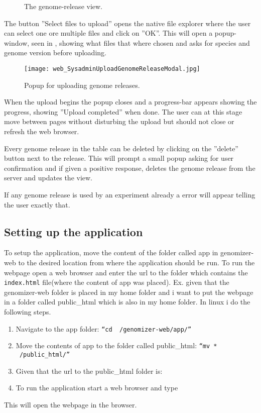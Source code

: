 \begin{figure}[h]
 \caption{The genome-release view.}
 \label{adm_web_genomereleaseView}
\end{figure}

The button ''Select files to upload'' opens the native file explorer where the user can select one ore multiple files and click on ''OK''. This will open a popup-window, seen in , showing what files that where chosen and asks for species and genome version before uploading. 

\begin{figure}[h]
 \centering
 \texttt{[image: web\_SysadminUploadGenomeReleaseModal.jpg]}
 \caption{Popup for uploading genome releases.}
 \label{adm_web_uploadconfirm}
\end{figure}

When the upload begins the popup closes and a progress-bar appears showing the progress, showing ''Upload completed'' when done. The user can at this stage move between pages without disturbing the upload but should not close or refresh the web browser. 

Every genome release in the table can be deleted by clicking on the ''delete'' button next to the release. This will prompt a small popup asking for user confirmation and if given a positive response, deletes the genome release from the server and updates the view. 

If any genome release is used by an experiment already a error will appear telling the user exactly that. 

\subsection{Setting up the application}
To setup the application, move the content of the folder called app in genomizer-web to the desired location from where the application should be run. To run the webpage open a web browser and enter the url to the folder which contains the \texttt{index.html} file(where the content of app was placed).
Ex. given that the genomizer-web folder is placed in my home folder and i want to put the webpage in a folder called public\_html which is also in my home folder. In linux i do the following steps.
\begin{enumerate}
	\item Navigate to the app folder: \texttt{“cd ~/genomizer-web/app/”}
	\item Move the contents of app to the folder called public\_html: \texttt{“mv * ~/public\_html/”}
	\item Given that the url to the public\_html folder is: 
	\item To run the application start a web browser and type 
\end{enumerate}
This will open the webpage in the browser.

